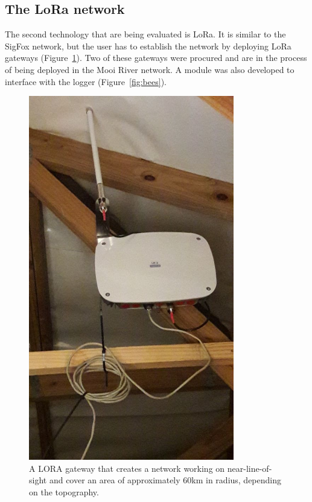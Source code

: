 \documentclass{wrcreport}
\begin{document}
\subsection{The LoRa network}

The second technology that are being evaluated is LoRa. It is similar to the SigFox network, but the user has to establish the network by deploying LoRa gateways (Figure~\ref{fig:lora}). Two of these gateways were procured and are in the process of being deployed in the Mooi River network. A module was also developed to interface with the logger (Figure~\ref{fig:bees}).

\begin{figure}[!htp]
  \begin{center}
    \includegraphics[width=0.8\textwidth]{LORA-gateway.jpg}
  \end{center}
  \caption[A LORA gateway.]{A LORA gateway that creates a network working on near-line-of-sight and cover an area of approximately 60km in radius, depending on the topography.}
\label{fig:lora}
\end{figure}
\end{document}
